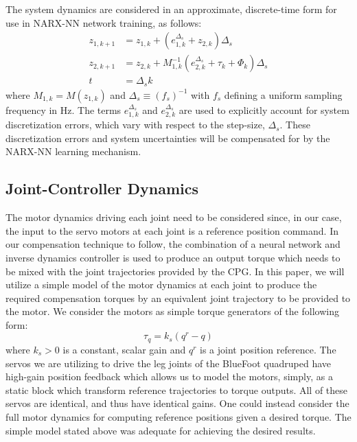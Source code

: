 The system dynamics are considered in an approximate, discrete-time form for use in NARX-NN network 
training, as follows:
	\begin{equation}
		\begin{split}
		{z}_{1,k+1} &= {z}_{1,k} + ( {e}_{1,k}^{\Delta_{s}} + {z}_{2,k} )\Delta_{s} \\
		{z}_{2,k+1} &= {z}_{2,k} + M^{-1}_{1,k}( {e}_{2,k}^{\Delta_{s}} + \tau_{k} + \Phi_{k}) \Delta_{s} \\
		t 			&= \Delta_{s} k
		\end{split}
		\label{eq::sampled_dynamics}
	\end{equation}
where $M_{1,k} = M(z_{1,k})$ and $\Delta_{s} \equiv (f_{s})^{-1}$ with $f_{s}$ defining a uniform 
sampling frequency in Hz. The terms ${e}_{1,k}^{\Delta_{s}}$ and ${e}_{2,k}^{\Delta_{s}}$ are used to explicitly 
account for system discretization errors, which vary with respect to the step-size, $\Delta_{s}$. These
discretization errors and system uncertainties will be compensated for by the NARX-NN learning mechanism.


\subsection{Joint-Controller Dynamics}
%
%
The motor dynamics driving each joint need to be considered since, in our case, the input to the
servo motors at each joint is a reference position command. In our compensation technique to follow,
the combination of a neural network and inverse dynamics controller is used to produce an output
torque which needs to be mixed  with the joint trajectories provided by the CPG. In this paper,
we will utilize a simple model of the motor dynamics at each joint to produce the required compensation
torques by an equivalent joint trajectory to be provided to the motor. We consider the motors as simple
torque generators of the following form:
	\begin{equation}
		\tau_{q} = k_{s}(q^{r}-q)
		\label{eq::servo_control_dynamics}
	\end{equation}
where $k_{s}>0$ is a constant, scalar gain and $q^{r}$ is a joint position reference. The servos we are utilizing to drive the leg joints of
the BlueFoot quadruped have high-gain position feedback which allows us to model the motors,
simply, as a static block which transform reference trajectories to torque outputs. All of these
servos are identical, and thus have identical gains. One could instead consider the full motor dynamics 
for computing reference positions given a desired torque. The simple model stated above was
adequate for achieving the desired results.